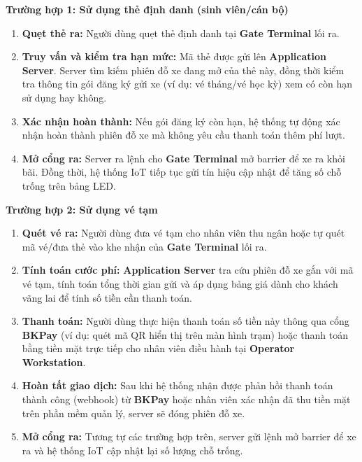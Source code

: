 \textbf{Trường hợp 1: Sử dụng thẻ định danh (sinh viên/cán bộ)}
\begin{enumerate}
    \item \textbf{Quẹt thẻ ra:} Người dùng quẹt thẻ định danh tại \textbf{Gate Terminal} lối ra.
    \item \textbf{Truy vấn và kiểm tra hạn mức:} Mã thẻ được gửi lên \textbf{Application Server}. Server tìm kiếm phiên đỗ xe đang mở của thẻ này, đồng thời kiểm tra thông tin gói đăng ký gửi xe (ví dụ: vé tháng/vé học kỳ) xem có còn hạn sử dụng hay không.
    \item \textbf{Xác nhận hoàn thành:} Nếu gói đăng ký còn hạn, hệ thống tự động xác nhận hoàn thành phiên đỗ xe mà không yêu cầu thanh toán thêm phí lượt.
    \item \textbf{Mở cổng ra:} Server ra lệnh cho \textbf{Gate Terminal} mở barrier để xe ra khỏi bãi. Đồng thời, hệ thống IoT tiếp tục gửi tín hiệu cập nhật để tăng số chỗ trống trên bảng LED.
\end{enumerate}

\textbf{Trường hợp 2: Sử dụng vé tạm}
\begin{enumerate}
    \item \textbf{Quét vé ra:} Người dùng đưa vé tạm cho nhân viên thu ngân hoặc tự quét mã vé/đưa thẻ vào khe nhận của \textbf{Gate Terminal} lối ra.
    \item \textbf{Tính toán cước phí:} \textbf{Application Server} tra cứu phiên đỗ xe gắn với mã vé tạm, tính toán tổng thời gian gửi và áp dụng bảng giá dành cho khách vãng lai để tính số tiền cần thanh toán.
    \item \textbf{Thanh toán:} Người dùng thực hiện thanh toán số tiền này thông qua cổng \textbf{BKPay} (ví dụ: quét mã QR hiển thị trên màn hình trạm) hoặc thanh toán bằng tiền mặt trực tiếp cho nhân viên điều hành tại \textbf{Operator Workstation}.
    \item \textbf{Hoàn tất giao dịch:} Sau khi hệ thống nhận được phản hồi thanh toán thành công (webhook) từ \textbf{BKPay} hoặc nhân viên xác nhận đã thu tiền mặt trên phần mềm quản lý, server sẽ đóng phiên đỗ xe.
    \item \textbf{Mở cổng ra:} Tương tự các trường hợp trên, server gửi lệnh mở barrier để xe ra và hệ thống IoT cập nhật lại số lượng chỗ trống.
\end{enumerate}
